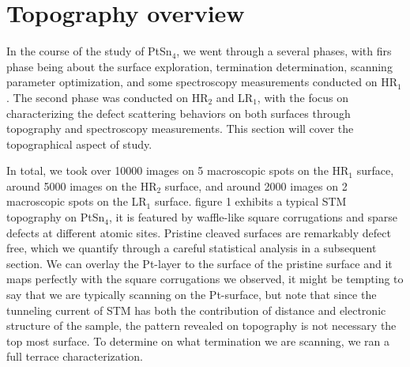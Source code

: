 \section{Topography overview}
In the course of the study of PtSn$_4$, we went through a several phases, with firs phase being about the surface exploration, termination determination, scanning parameter optimization, and some spectroscopy measurements conducted on HR$_1$. The second phase was conducted on HR$_2$ and LR$_1$, with the focus on characterizing the defect scattering behaviors on both surfaces through topography and spectroscopy measurements. This section will cover the topographical aspect of study. 

In total, we took over 10000 images on 5 macroscopic spots on the HR$_1$ surface, around 5000 images on the HR$_2$ surface, and around 2000 images on 2 macroscopic spots on the LR$_1$ surface. 
figure 1 exhibits a typical STM topography on PtSn$_4$, it is featured by waffle-like square corrugations and sparse defects at different atomic sites. Pristine cleaved surfaces are remarkably defect free, which we quantify through a careful statistical analysis in a subsequent section. We can overlay the Pt-layer to the surface of the pristine surface and it maps perfectly with the square corrugations we observed, it might be tempting to say that we are typically scanning on the Pt-surface, but note that since the tunneling current of STM has both the contribution of distance and electronic structure of the sample, the pattern revealed on topography is not necessary the top most surface. To determine on what termination we are scanning, we ran a full terrace characterization.    

